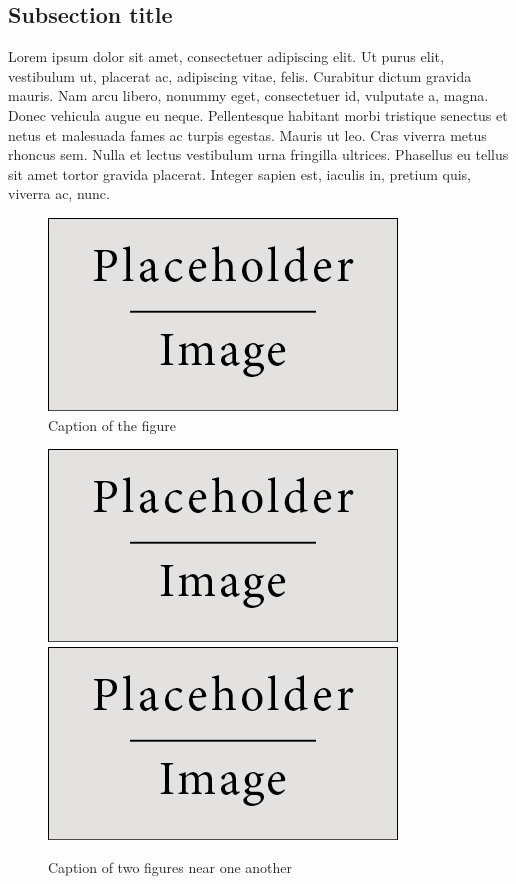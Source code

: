 \documentclass[a4paper]{article}
\theoremstyle{plain}
\begin{document}
\subsection{Subsection title}

Lorem ipsum dolor sit amet, consectetuer adipiscing elit. Ut purus elit, vestibulum ut, placerat ac, adipiscing vitae, felis. Curabitur dictum gravida mauris. Nam arcu libero, nonummy eget, consectetuer id, vulputate a, magna. Donec vehicula augue eu neque. Pellentesque habitant morbi tristique senectus et netus et malesuada fames ac turpis egestas. Mauris ut leo. Cras viverra metus rhoncus sem. Nulla et lectus vestibulum urna fringilla ultrices. Phasellus eu tellus sit amet tortor gravida placerat. Integer sapien est, iaculis in, pretium quis, viverra ac, nunc.

\begin{figure}[H]
\centering
\includegraphics[scale=0.6]{test_image.jpg}
\caption{Caption of the figure}
\end{figure}

\begin{figure}[H]
\centering
\includegraphics[scale=0.4]{test_image.jpg}
\includegraphics[scale=0.4]{test_image.jpg}
\caption{Caption of two figures near one another}
\end{figure}
\end{document}
